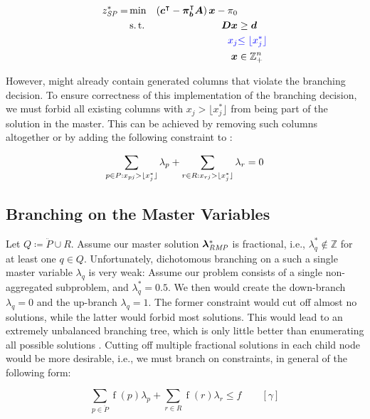 \begin{equation}
\begin{aligned}
z^*_\SP{} = &\min & \left( \vec{c}\transpose - \vec{\pi}_\vec{b}\transpose \mat{A} \right) \vec{x} - \pi_0 & \\
&\st & \mat{D} \vec{x} & \geq \vec{d} \\
&& {\color{blue} x_j} & {\color{blue} \leq \floor{x_j^*}}\\
&& \vec{x} & \in \mathbb{Z}_+^n
\end{aligned}
\end{equation}

However, \RMP{} might already contain generated columns that violate the branching decision. To ensure correctness of this implementation of the branching decision, we must forbid all existing columns with $x_j > \lfloor x_j^* \rfloor$ from being part of the solution in the master. This can be achieved by removing such columns altogether or by adding the following constraint to \MP{}:

\begin{equation}
\sum_{p \in P: x_{pj} > \lfloor x_j^*\rfloor} \lambda_p + \sum_{r \in R: x_{rj} > \lfloor x_j^*\rfloor} \lambda_r = 0
\end{equation}

\subsection{Branching on the Master Variables}\label{sec:cg_bp_bp_branching_master}
Let $Q \coloneqq \ddot{P} \cup R$. Assume our master solution ${\bm{\lambda}}^*_{\textit{RMP}}{}$ is fractional, i.e., $\lambda_q^* \not\in \mathbb{Z}$ for at least one $q \in Q$. Unfortunately, dichotomous branching on a such a single master variable $\lambda_q$ is very weak: Assume our problem consists of a single non-aggregated subproblem, and $\lambda_q^* = 0.5$. We then would create the down-branch $\lambda_q = 0$ and the up-branch $\lambda_q = 1$. The former constraint would cut off almost no solutions, while the latter would forbid most solutions. This would lead to an extremely unbalanced branching tree, which is only little better than enumerating all possible solutions \cite{thebook}. Cutting off multiple fractional solutions in each child node would be more desirable, i.e., we must branch on constraints, in general of the following form:

\begin{equation*}
\sum_{p \in \ddot{P}} \operatorname{f}(p) \lambda_p + \sum_{r \in R} \operatorname{f}(r) \lambda_r \leq f \qquad \left[\gamma\right]
\end{equation*}

